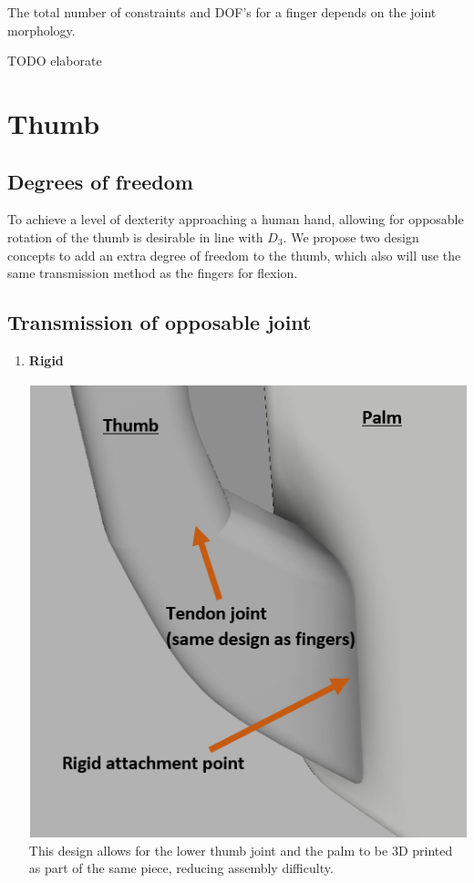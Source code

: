 \documentclass[11pt,3p]{report}
\begin{document}
\begin{multicols}{2}
		The total number of constraints and DOF's for a finger depends on the joint morphology.
		
		TODO elaborate



	\section{Thumb}
	
		\subsection{Degrees of freedom}
To achieve a level of dexterity approaching a human hand, allowing for opposable rotation of the thumb is desirable in line with $D_3$. We propose two design concepts to add an extra degree of freedom to the thumb, which also will use the same transmission method as the fingers for flexion. 

		
		\subsection{Transmission of opposable joint}
			\begin{enumerate}[noitemsep]
			\item \textbf{Rigid} {
			
			\includegraphics[scale=0.55]{rigid_thumb.PNG}
						This design allows for the lower thumb joint and the palm to be 3D printed as part of the same piece, reducing assembly difficulty.
			}


\end{enumerate}
\end{multicols}
\end{document}
